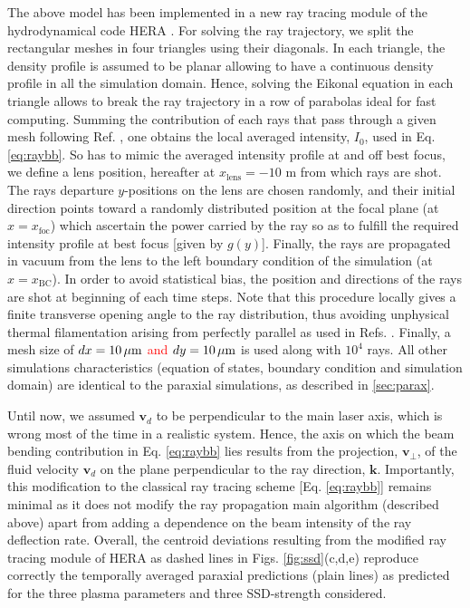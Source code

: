 \documentclass[%
 reprint,
 amsmath,amssymb,
 aps,
]{revtex4-1}
\begin{document}
The above model has been implemented in a new  ray  tracing module of the hydrodynamical code HERA \cite[]{Loiseau_2006}.
For solving the ray trajectory, we split the rectangular meshes in four triangles using their diagonals.  In each triangle, the density profile is assumed to be planar allowing to have a continuous density profile in all the simulation domain. 
Hence, solving the Eikonal equation  in each triangle allows to break the ray trajectory in a row of parabolas ideal for fast computing. 
Summing the contribution of each rays that pass through a given mesh following Ref. \cite[]{POP_Debayle_2019}, one obtains the local averaged intensity, $ I_0$, used in Eq. \eqref{eq:raybb}.
So has to mimic the averaged intensity profile at and off best focus, we define a lens position, hereafter at $x_\mathrm{lens}=-10$ m from which rays are shot. 
The rays departure $y$-positions  on the lens are chosen randomly, and their initial direction points toward a randomly distributed  position at the focal plane (at $x=x_\mathrm{foc}$) which ascertain the power carried by the ray so as to fulfill the required intensity profile at best focus [given by $g(y)$]. 
Finally, the rays are propagated  in vacuum from the lens to the left boundary condition  of the simulation (at $x=x_\mathrm{BC}$).
In order to avoid statistical bias, the position and directions of the rays are shot at beginning of each time steps. 
Note that this procedure locally gives a  finite   transverse opening angle to the ray distribution, thus avoiding unphysical thermal filamentation  arising from perfectly parallel as used in Refs. \cite[]{Colaitis_2014,Lefebvre_2018}.
Finally, a mesh size of    \textcolor{red}{   $dx = 10\, \rm \mu m$ and $dy =10\, \rm \mu m$} is used along with  $10^4$ rays. All other simulations characteristics (equation of states, boundary condition and simulation domain) are identical to the paraxial simulations, as described in \ref{sec:parax}.

Until now, we assumed  $\mathbf{v}_d$ to be perpendicular to the main laser axis, which is wrong most of the time in a realistic system. Hence, the axis on which the beam bending contribution in Eq. \eqref{eq:raybb}  lies results from the projection,  $\mathbf{v}_\perp$, of the fluid velocity $\mathbf{v}_d$ on the plane perpendicular to the ray direction, $ \mathbf{k}$.
Importantly, this modification to the classical ray tracing scheme [Eq. \eqref{eq:raybb}] remains minimal as it does not modify the  ray propagation main algorithm (described above) apart from adding a dependence on the beam intensity of the ray deflection rate. 
Overall, the centroid deviations resulting from the modified ray tracing module of HERA as dashed lines in Figs. \ref{fig:ssd}(c,d,e) reproduce correctly the temporally averaged paraxial predictions (plain lines) as predicted for the three plasma parameters and three SSD-strength considered.
\end{document}
